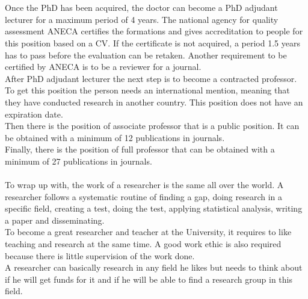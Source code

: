 \documentclass{article}
\begin{document}
\\\\
Once the PhD has been acquired, the doctor can become a PhD adjudant lecturer for a maximum period of 4 years. The national agency for quality assessment ANECA certifies the formations and gives accreditation to people for this position based on a CV. If the certificate is not acquired, a period 1.5 years has to pass before the evaluation can be retaken. Another requirement to be certified by ANECA is to be a reviewer for a journal.
\\
After PhD adjudant lecturer the next step is to become a contracted professor. To get this position the person needs an international mention, meaning that they have conducted research in another country. This position does not have an expiration date.\\
Then there is the position of associate professor that is a public position. It can be obtained with a minimum of 12 publications in journals.\\
Finally, there is the position of full professor that can be obtained with a minimum of 27 publications in journals.
\\\\
To wrap up with, the work of a researcher is the same all over the world. A researcher follows a systematic routine of finding a gap, doing research in a specific field, creating a test, doing the test, applying statistical analysis, writing a paper and disseminating.
\\
To become a great researcher and teacher at the University, it requires to like teaching and research at the same time. A good work ethic is also required because there is little supervision of the work done.
\\
A researcher can basically research in any field he likes but needs to think about if he will get funds for it and if he will be able to find a research group in this field.
\end{document}
